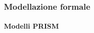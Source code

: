 \begin {frame}
\frametitle {Modellazione formale}
\framesubtitle{Modelli PRISM}
\begin{figure}
	\centerline{}
\end{figure}
\end{frame}

